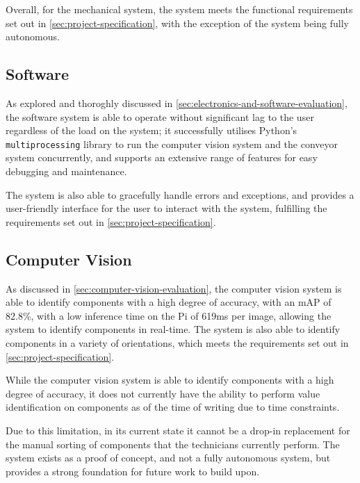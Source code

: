 Overall, for the mechanical system, the system meets the functional requirements set out in \autoref{sec:project-specification}, with the exception of the system being fully autonomous.

\subsection{Software}
As explored and thoroghly discussed in \autoref{sec:electronics-and-software-evaluation}, the software system is able to operate without significant lag to the user regardless of the load on the system; it successfully utilises Python's \texttt{multiprocessing} library to run the computer vision system and the conveyor system concurrently, and supports an extensive range of features for easy debugging and maintenance.

The system is also able to gracefully handle errors and exceptions, and provides a user-friendly interface for the user to interact with the system, fulfilling the requirements set out in \autoref{sec:project-specification}.

\subsection{Computer Vision}
As discussed in \autoref{sec:computer-vision-evaluation}, the computer vision system is able to identify components with a high degree of accuracy, with an mAP of 82.8\%, with a low inference time on the Pi of 619ms per image, allowing the system to identify components in real-time. The system is also able to identify components in a variety of orientations, which meets the requirements set out in \autoref{sec:project-specification}.

While the computer vision system is able to identify components with a high degree of accuracy, it does not currently have the ability to perform value identification on components as of the time of writing due to time constraints.

Due to this limitation, in its current state it cannot be a drop-in replacement for the manual sorting of components that the technicians currently perform. The system exists as a proof of concept, and not a fully autonomous system, but provides a strong foundation for future work to build upon. 

